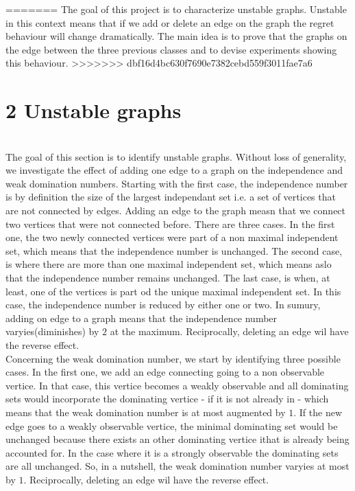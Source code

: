\documentclass{article} %
\begin{document}
 
 
 
=======
 The goal of this project is to characterize unstable graphs. Unstable in this context means that if we add or delete an edge on the graph the regret behaviour will change dramatically. The main idea is to prove that the graphs on the edge between the three previous classes and to devise experiments showing this behaviour.
>>>>>>> dbf16d4bc630f7690e7382cebd559f3011fae7a6
 
\section*{2 Unstable graphs}
~\\
The goal of this section is to identify unstable graphs. Without loss of generality, we investigate the effect of adding one edge to a graph on the independence and weak domination numbers. Starting with the first case, the independence number is by definition the size of the largest independant set i.e. a set of vertices that are not connected by edges. Adding an edge to the graph measn that we connect two vertices that were not connected before. There are three cases. In the first one, the two newly connected vertices were part of a non maximal independent set, which means that the independence number is unchanged. The second case, is where there are more than one maximal independent set, which means aslo that the independence number remains unchanged. The last case, is when, at least, one of the vertices is part od the unique maximal independent set. In this case, the independence number is reduced by either one or two. In sumury, adding on edge to a graph means that the independence number varyies(diminishes) by $2$ at the maximum. Reciprocally, deleting an edge wil have the reverse effect.\\

Concerning the weak domination number, we start by identifying three possible cases. In the first one, we add an edge connecting going to a non observable vertice. In that case, this vertice becomes a weakly observable and all dominating sets would incorporate the dominating vertice - if it is not already in - which means that the weak domination number is at most augmented by $1$. If the new edge goes to a weakly observable vertice, the minimal dominating set would be unchanged because there exists an other dominating vertice ithat is already being accounted for. In the case where it is a strongly observable the dominating sets are all unchanged. So, in a nutshell, the weak domination number varyies at most by $1$. Reciprocally, deleting an edge wil have the reverse effect.\\
\end{document}
